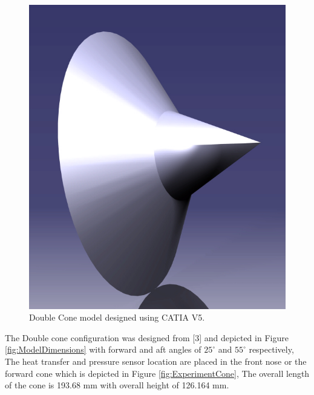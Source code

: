 \begin{figure}[ht]
\centering
  \includegraphics[width=0.4\linewidth]{images/CONE.jpg}
  \caption{ Double Cone model designed using CATIA V5.}
  \label{fig:CATIA_CONE}
\end{figure}

The Double cone configuration was designed from [3] and depicted in Figure \ref{fig:ModelDimensions} with forward and aft angles of $25^\circ$ and $55^\circ$
respectively, The heat transfer and pressure sensor location are placed in the front nose or the forward cone which is depicted in Figure \ref{fig:ExperimentCone}, The overall length of the cone is 193.68 mm with overall height of 126.164 mm.